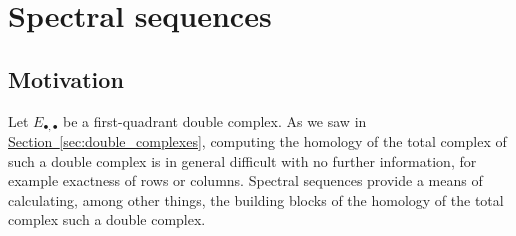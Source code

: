 \documentclass[main.tex]{subfiles}
\begin{document}
\chapter{Spectral sequences}
\label{ch:spectral_sequences}

\section{Motivation}
\label{sec:motivation}

Let $E_{\bullet,\bullet}$ be a first-quadrant double complex. As we saw in \hyperref[sec:double_complexes]{Section~\ref*{sec:double_complexes}}, computing the homology of the total complex of such a double complex is in general difficult with no further information, for example exactness of rows or columns. Spectral sequences provide a means of calculating, among other things, the building blocks of the homology of the total complex such a double complex.
\end{document}
